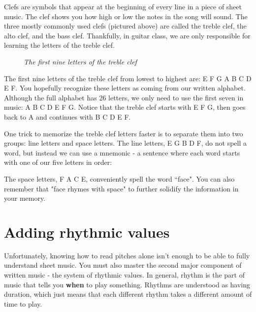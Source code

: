 Clefs are symbols that appear at the beginning of every line in a piece of sheet music. The clef shows you how high or low the notes in the song will sound. The three mostly commonly used clefs (pictured above) are called the treble clef, the alto clef, and the bass clef. Thankfully, in guitar class, we are only responsible for learning the letters of the treble clef. 

\begin{figure}[h]
	\begin{center}
		{\large
		}
	\end{center} 
	\caption{\textit{The first nine letters of the treble clef}}
\end{figure} 
	
\vspace{3mm}

The first nine letters of the treble clef from lowest to highest are: E F G A B C D E F. You hopefully recognize these letters as coming from our written alphabet. Although the full alphabet has 26 letters, we only need to use the first seven in music: A B C D E F G. Notice that the treble clef starts with E F G, then goes back to A and continues with B C D E F. 

One trick to memorize the treble clef letters faster is to separate them into two groups: line letters and space letters. The line letters, E G B D F, do not spell a word, but instead we can use a mnemonic - a sentence where each word starts with one of our five letters in order: 

\begin{center}  \end{center}

The space letters, F A C E, conveniently spell the word ``face". You can also remember that "face rhymes with space" to further solidify the information in your memory.

\section {Adding rhythmic values}

Unfortunately, knowing how to read pitches alone isn't enough to be able to fully understand sheet music. You must also master the second major component of written music - the system of rhythmic values. In general, rhythm is the part of music that tells you \textbf{when} to play something. Rhythms are understood as having duration, which just means that each different rhythm takes a different amount of time to play. 

